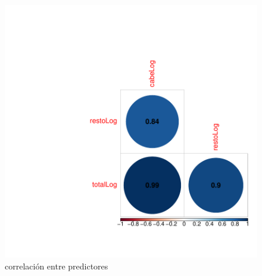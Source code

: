 \documentclass{article}
\begin{document}
\begin{figure}[h]
\centering
\begin{adjustbox}{width=7cm,height=7cm,clip,trim=1.5cm 0.5cm 0cm 1.5cm}
\includegraphics{ProyectoHC-corrPlotX}
\end{adjustbox}
\caption{correlación entre predictores}
\label{corrPlotX}
\end{figure}






% 
% 
\clearpage
% 
\end{document}
